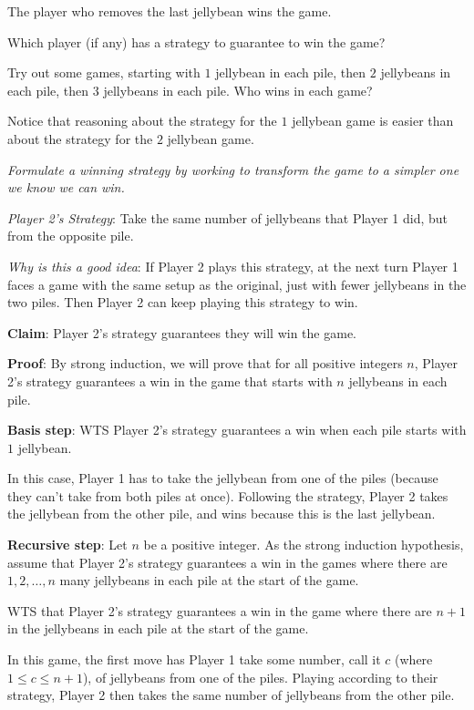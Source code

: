 \documentclass[12pt, oneside]{article}
\begin{document}
The player who removes the last jellybean wins the game.

Which player (if any) has a strategy to guarantee
to win the game?


Try out some games, starting with $1$ jellybean in each pile,
then $2$ jellybeans in each pile, then $3$ jellybeans in each pile.
Who wins in each game?

\vspace{200pt}


Notice that reasoning about the strategy for the $1$ jellybean 
game is easier than about the strategy for the $2$ jellybean game.

{\it Formulate a winning strategy by working to 
transform the game to a simpler one we know we can win.}

\newpage

{\it Player 2's Strategy}: Take the same number of jellybeans that Player 1 did, 
but from the opposite pile. 


{\it Why is this a good idea}: If Player 2 plays this strategy, at the next turn
Player 1 faces a game with the same setup as the original, just with fewer
jellybeans in the two piles. Then Player 2 can keep playing this strategy to win.

{\bf Claim}: Player 2's strategy guarantees they will win the game.

{\bf Proof}: By strong induction, we will prove that for all positive 
integers $n$, Player 2's strategy guarantees a win in the game that starts with 
$n$ jellybeans in each pile.

{\bf Basis step}: WTS Player 2's strategy guarantees a win 
when each pile starts with $1$ jellybean.

In this case, Player 1 has to take the jellybean from one of the piles
(because they can't take from both piles at once).
Following the strategy, Player 2 takes the jellybean from the 
other pile, and wins because this is the last jellybean.

{\bf Recursive step}: Let $n$ be a positive integer. 
As the strong induction hypothesis, assume that
Player 2's strategy guarantees a win in the games 
where there are $1, 2, \ldots, n$ many jellybeans in each 
pile at the start of the game.

WTS that Player 2's strategy guarantees a win in the game where
there are $n+1$ in the jellybeans in each pile at the start of the game.

In this game, the first move has Player 1 take 
some number, call it $c$ (where $1 \leq c \leq n+1$),
of jellybeans from one of the piles. 
Playing according to their strategy, Player 2 then 
takes the same number of jellybeans from  the other pile.
\end{document}
